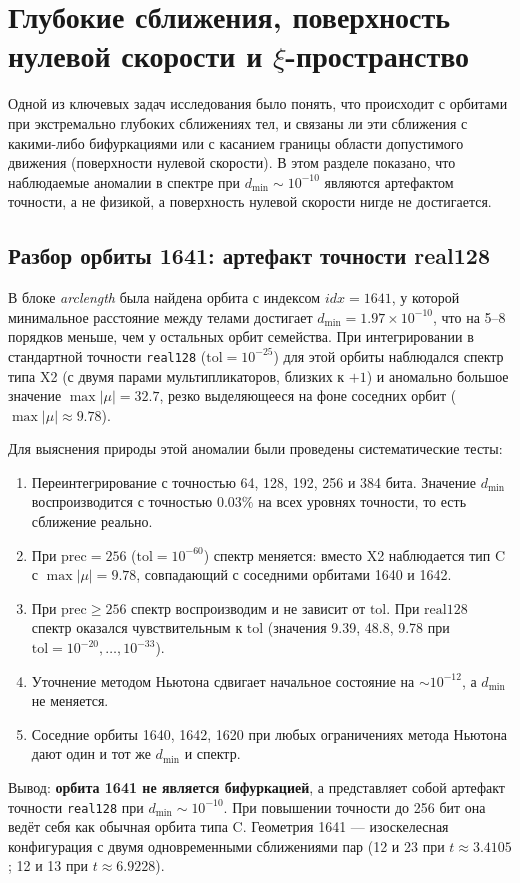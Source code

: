 \section{Глубокие сближения, поверхность нулевой скорости и \(\xi\)-пространство}

Одной из ключевых задач исследования было понять, что происходит с орбитами при экстремально глубоких сближениях тел, и связаны ли эти сближения с какими-либо бифуркациями или с касанием границы области допустимого движения (поверхности нулевой скорости). В этом разделе показано, что наблюдаемые аномалии в спектре при \(d_{\min} \sim 10^{-10}\) являются артефактом точности, а не физикой, а поверхность нулевой скорости нигде не достигается.

\subsection{Разбор орбиты 1641: артефакт точности real128}
В блоке \textit{arclength} была найдена орбита с индексом \(idx=1641\), у которой минимальное расстояние между телами достигает \(d_{\min} = 1.97 \times 10^{-10}\), что на 5–8 порядков меньше, чем у остальных орбит семейства. При интегрировании в стандартной точности \texttt{real128} (\(\text{tol}=10^{-25}\)) для этой орбиты наблюдался спектр типа X2 (с двумя парами мультипликаторов, близких к \(+1\)) и аномально большое значение \(\max|\mu| = 32.7\), резко выделяющееся на фоне соседних орбит (\(\max|\mu| \approx 9.78\)).

Для выяснения природы этой аномалии были проведены систематические тесты:
\begin{enumerate}
    \item Переинтегрирование с точностью 64, 128, 192, 256 и 384 бита. Значение \(d_{\min}\) воспроизводится с точностью \(0.03\%\) на всех уровнях точности, то есть сближение реально.
    \item При \(\text{prec}=256\) (\(\text{tol}=10^{-60}\)) спектр меняется: вместо X2 наблюдается тип C с \(\max|\mu| = 9.78\), совпадающий с соседними орбитами 1640 и 1642.
    \item При \(\text{prec} \geq 256\) спектр воспроизводим и не зависит от \(\text{tol}\). При \(\text{real128}\) спектр оказался чувствительным к \(\text{tol}\) (значения 9.39, 48.8, 9.78 при \(\text{tol}=10^{-20}, \dots, 10^{-33}\)).
    \item Уточнение методом Ньютона сдвигает начальное состояние на \(\sim 10^{-12}\), а \(d_{\min}\) не меняется.
    \item Соседние орбиты 1640, 1642, 1620 при любых ограничениях метода Ньютона дают один и тот же \(d_{\min}\) и спектр.
\end{enumerate}
Вывод: \textbf{орбита 1641 не является бифуркацией}, а представляет собой артефакт точности \texttt{real128} при \(d_{\min} \sim 10^{-10}\). При повышении точности до 256 бит она ведёт себя как обычная орбита типа C. Геометрия 1641 — изоскелесная конфигурация с двумя одновременными сближениями пар (12 и 23 при \(t \approx 3.4105\); 12 и 13 при \(t \approx 6.9228\)).

